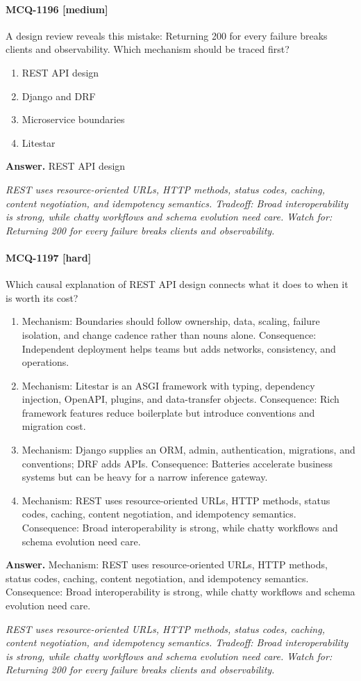 \paragraph{MCQ-1196 [medium]} A design review reveals this mistake: Returning 200 for every failure breaks clients and observability. Which mechanism should be traced first?
\begin{enumerate}[label=\Alph*.]
\item REST API design
\item Django and DRF
\item Microservice boundaries
\item Litestar
\end{enumerate}
\noindent\textbf{Answer.} REST API design
\par\textit{REST uses resource-oriented URLs, HTTP methods, status codes, caching, content negotiation, and idempotency semantics. Tradeoff: Broad interoperability is strong, while chatty workflows and schema evolution need care. Watch for: Returning 200 for every failure breaks clients and observability.}
\paragraph{MCQ-1197 [hard]} Which causal explanation of REST API design connects what it does to when it is worth its cost?
\begin{enumerate}[label=\Alph*.]
\item Mechanism: Boundaries should follow ownership, data, scaling, failure isolation, and change cadence rather than nouns alone. Consequence: Independent deployment helps teams but adds networks, consistency, and operations.
\item Mechanism: Litestar is an ASGI framework with typing, dependency injection, OpenAPI, plugins, and data-transfer objects. Consequence: Rich framework features reduce boilerplate but introduce conventions and migration cost.
\item Mechanism: Django supplies an ORM, admin, authentication, migrations, and conventions; DRF adds APIs. Consequence: Batteries accelerate business systems but can be heavy for a narrow inference gateway.
\item Mechanism: REST uses resource-oriented URLs, HTTP methods, status codes, caching, content negotiation, and idempotency semantics. Consequence: Broad interoperability is strong, while chatty workflows and schema evolution need care.
\end{enumerate}
\noindent\textbf{Answer.} Mechanism: REST uses resource-oriented URLs, HTTP methods, status codes, caching, content negotiation, and idempotency semantics. Consequence: Broad interoperability is strong, while chatty workflows and schema evolution need care.
\par\textit{REST uses resource-oriented URLs, HTTP methods, status codes, caching, content negotiation, and idempotency semantics. Tradeoff: Broad interoperability is strong, while chatty workflows and schema evolution need care. Watch for: Returning 200 for every failure breaks clients and observability.}
